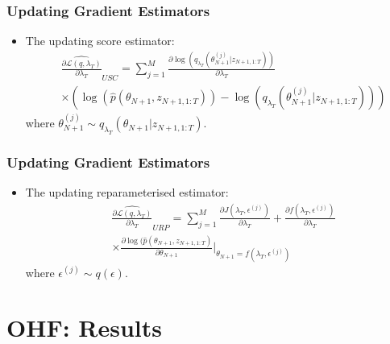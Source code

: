 \documentclass[11pt]{beamer}\usepackage[]{graphicx}\usepackage[]{color}
\begin{document}
\begin{frame}
\frametitle{Updating Gradient Estimators}
\begin{itemize}
\item The updating score estimator:
\begin{align*}
&\widehat{\frac{\partial\mathcal{L}(q, \lambda_T)}{\partial \lambda_T}}_{USC} = \sum_{j = 1}^M \frac{\partial \log(q_{\lambda_T}(\theta_{N+1}^{(j)} | z_{N+1, 1:T}))}{\partial \lambda_T}  \\
&\times \left(\log(\hat{p}(\theta_{N+1},  z_{N+1, 1:T})) - \log(q_{\lambda_T}(\theta_{N+1}^{(j)} | z_{N+1, 1:T})) \right)
\end{align*}
where $\theta_{N+1}^{(j)} \sim q_{\lambda_T}(\theta_{N+1} | z_{N+1, 1:T})$. 
\end{itemize}
\end{frame}

\begin{frame}
\frametitle{Updating Gradient Estimators}
\begin{itemize}
\item The updating reparameterised estimator:
\begin{align*}
&\widehat{\frac{\partial\mathcal{L}(q, \lambda_T)}{\partial \lambda_T}}_{URP} = \sum_{j = 1}^M \frac{\partial J(\lambda_T, \epsilon^{(j)})}{\partial \lambda_T} + \frac{\partial f(\lambda_T, \epsilon^{(j)})}{\partial \lambda_T} \\
&\times \frac{\partial \log(\hat{p}(\theta_{N+1},  z_{N+1, 1:T})}{\partial \theta_{N+1}} \bigg\rvert_{\theta_{N+1} = f(\lambda_T, \epsilon^{(j)})} 
\end{align*}
where $\epsilon^{(j)} \sim q(\epsilon)$.
\end{itemize}
\end{frame}

\section{OHF: Results}
\end{document}

